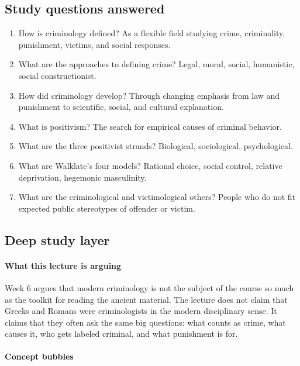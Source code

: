 \documentclass[11pt]{article}
\begin{document}
\subsection{Study questions answered}

\begin{enumerate}
\item How is criminology defined? As a flexible field studying crime, criminality, punishment, victims, and social responses.
\item What are the approaches to defining crime? Legal, moral, social, humanistic, social constructionist.
\item How did criminology develop? Through changing emphasis from law and punishment to scientific, social, and cultural explanation.
\item What is positivism? The search for empirical causes of criminal behavior.
\item What are the three positivist strands? Biological, sociological, psychological.
\item What are Walklate's four models? Rational choice, social control, relative deprivation, hegemonic masculinity.
\item What are the criminological and victimological others? People who do not fit expected public stereotypes of offender or victim.
\end{enumerate}

\subsection{Deep study layer}

\paragraph{What this lecture is arguing}

Week 6 argues that modern criminology is not the subject of the course so much as the toolkit for reading the ancient material. The lecture does not claim that Greeks and Romans were criminologists in the modern disciplinary sense. It claims that they often ask the same big questions: what counts as crime, what causes it, who gets labeled criminal, and what punishment is for.

\paragraph{Concept bubbles}
\end{document}
